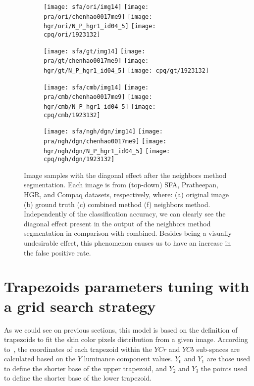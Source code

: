 \begin{figure*}[!htb]
    \centering
    \begin{subfigure}[t]{0.18\textwidth}
        \texttt{[image: sfa/ori/img14]}
        \texttt{[image: pra/ori/chenhao0017me9]}
        \texttt{[image: hgr/ori/N\_P\_hgr1\_id04\_5]}
        \texttt{[image: cpq/ori/1923132]}
        \caption{}
    \end{subfigure}
    \begin{subfigure}[t]{0.18\textwidth}
        \texttt{[image: sfa/gt/img14]}
        \texttt{[image: pra/gt/chenhao0017me9]}
        \texttt{[image: hgr/gt/N\_P\_hgr1\_id04\_5]}
        \texttt{[image: cpq/gt/1923132]}
        \caption{}
    \end{subfigure}
    \begin{subfigure}[t]{0.18\textwidth}
        \texttt{[image: sfa/cmb/img14]}
        \texttt{[image: pra/cmb/chenhao0017me9]}
        \texttt{[image: hgr/cmb/N\_P\_hgr1\_id04\_5]}
        \texttt{[image: cpq/cmb/1923132]}
        \caption{}
    \end{subfigure}
    \begin{subfigure}[t]{0.18\textwidth}
        \texttt{[image: sfa/ngh/dgn/img14]}
        \texttt{[image: pra/ngh/dgn/chenhao0017me9]}
        \texttt{[image: hgr/ngh/dgn/N\_P\_hgr1\_id04\_5]}
        \texttt{[image: cpq/ngh/dgn/1923132]}
        \caption{}
    \end{subfigure}

    \caption[Image samples with the diagonal effect after the neighbors method segmentation]{Image samples with the diagonal effect after the neighbors method segmentation. Each image is from (top-down) SFA, Pratheepan, HGR, and Compaq datasets, respectively, where: (a) original image (b) ground truth (c) combined method (f) neighbors method. Independently of the classification accuracy, we can clearly see the diagonal effect present in the output of the neighbors method segmentation in comparison with combined. Besides being a visually undesirable effect, this phenomenon causes us to have an increase in the false positive rate.}
    \label{fig:diagonal_effect}
\end{figure*}


\section{Trapezoids parameters tuning with a grid search strategy}
\label{sec:trapezoids_params_tunning}
\noindent As we could see on previous sections, this model is based on the definition of trapezoids to fit the skin color pixels distribution from a given image. According to~\citet{brancati:17}, the coordinates of each trapezoid within the $YCr$ and $YCb$ sub-spaces are calculated based on the $Y$ luminance component values. $Y_0$ and $Y_1$ are those used to define the shorter base of the upper trapezoid, and $Y_2$ and $Y_3$ the points used to define the shorter base of the lower trapezoid.

